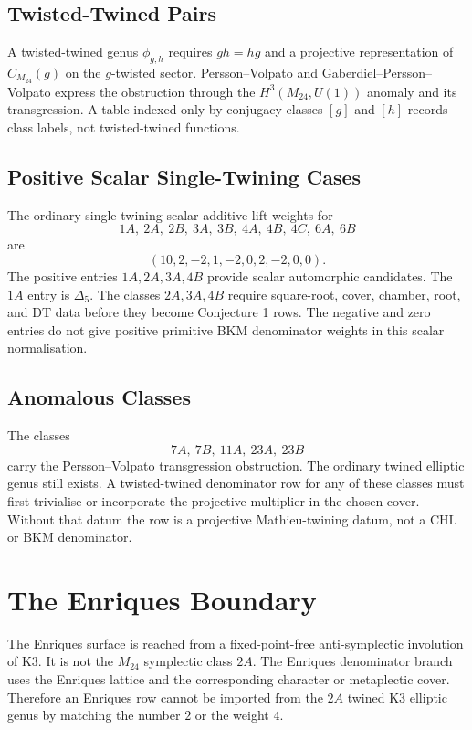 \documentclass[11pt]{article}
\providecommand{\Delf}{\Delta_5}
\begin{document}
\subsection{Twisted-Twined Pairs}

A twisted-twined genus \(\phi_{g,h}\) requires \(gh=hg\) and a
projective representation of \(C_{M_{24}}(g)\) on the \(g\)-twisted
sector.  Persson--Volpato and Gaberdiel--Persson--Volpato express the
obstruction through the \(H^3(M_{24},U(1))\) anomaly and its
transgression.  A table indexed only by conjugacy classes \([g]\) and
\([h]\) records class labels, not twisted-twined functions.

\subsection{Positive Scalar Single-Twining Cases}

The ordinary single-twining scalar additive-lift weights for
\[
1A,\ 2A,\ 2B,\ 3A,\ 3B,\ 4A,\ 4B,\ 4C,\ 6A,\ 6B
\]
are
\[
  (10,2,-2,1,-2,0,2,-2,0,0).
\]
The positive entries \(1A,2A,3A,4B\) provide scalar automorphic
candidates.  The \(1A\) entry is \(\Delf\).  The classes \(2A,3A,4B\)
require square-root, cover, chamber, root, and DT data before they
become Conjecture 1 rows.  The negative and zero entries do not give
positive primitive BKM denominator weights in this scalar
normalisation.

\subsection{Anomalous Classes}

The classes
\[
  7A,\ 7B,\ 11A,\ 23A,\ 23B
\]
carry the Persson--Volpato transgression obstruction.  The ordinary
twined elliptic genus still exists.  A twisted-twined denominator row
for any of these classes must first trivialise or incorporate the
projective multiplier in the chosen cover.  Without that datum the row
is a projective Mathieu-twining datum, not a CHL or BKM
denominator.

\section{The Enriques Boundary}

The Enriques surface is reached from a fixed-point-free anti-symplectic
involution of K3.  It is not the \(M_{24}\) symplectic class \(2A\).
The Enriques denominator branch uses the Enriques lattice and the
corresponding character or metaplectic cover.  Therefore an Enriques
row cannot be imported from the \(2A\) twined K3 elliptic genus by
matching the number \(2\) or the weight \(4\).
\end{document}
